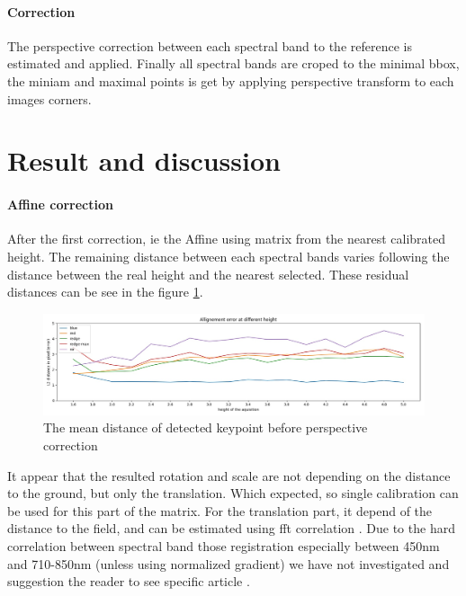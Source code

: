 \documentclass[]{elsarticle}
\begin{document}
			\paragraph{Correction}
			The perspective correction between each spectral band to the reference is estimated and applied.
			Finally all spectral bands are croped to the minimal bbox,
			the miniam and maximal points is get by applying perspective transform to each images corners.
		
		\section{Result and discussion}
		
			\paragraph{Affine correction} After the first correction, ie the Affine using matrix from the nearest calibrated height.
			The remaining distance between each spectral bands varies following the distance between the real height and the nearest selected.
			These residual distances can be see in the figure \ref{fig:affine-error}.
			
			\begin{figure}[!htb]
				\centering
				\includegraphics[width=\linewidth]{../figures/affine-allignement-rmse.jpg}
				\caption{The mean distance of detected keypoint before perspective correction}
				\label{fig:affine-error}
			\end{figure}
		
			It appear that the resulted rotation and scale are not depending on the distance to the ground, but only the translation.
			Which expected, so single calibration can be used for this part of the matrix.
			For the translation part, it depend of the distance to the field, and can be estimated using fft correlation \cite{506761}.
			Due to the hard correlation between spectral band those registration especially between 450nm and 710-850nm (unless using normalized gradient)
			we have not investigated and suggestion the reader to see specific article \cite{rabatel:hal-01684135}.
		
\end{document}
